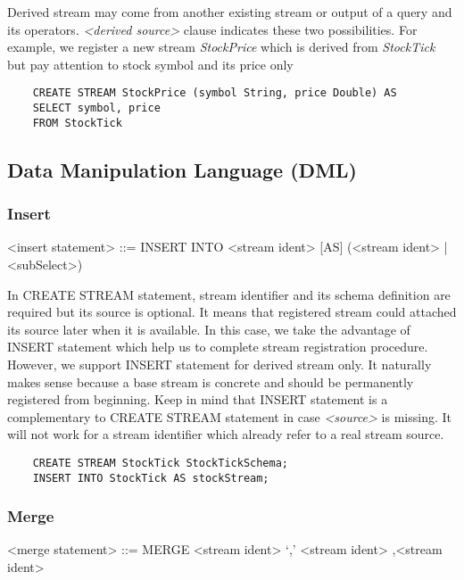 Derived stream may come from another existing stream or output of a query and its operators. \textit{<derived source>} clause indicates these two possibilities. For example, we register a new stream \textit{StockPrice} which is derived from \textit{StockTick} but pay attention to stock symbol and its price only
\begin{lstlisting}
	CREATE STREAM StockPrice (symbol String, price Double) AS
	SELECT symbol, price 
	FROM StockTick
\end{lstlisting}


\subsection{Data Manipulation Language (DML)}

\subsubsection{Insert}

\begin{grammar}
<insert statement> ::= INSERT INTO <stream ident> [AS] 
							(<stream ident> | <subSelect>)
\end{grammar}

In CREATE STREAM statement, stream identifier and its schema definition are required but its source is optional. It means that registered stream could attached its source later when it is available. In this case, we take the advantage of INSERT statement which help us to complete stream registration procedure. However, we support INSERT statement for derived stream only. It naturally makes sense because a base stream is concrete and should be permanently registered from beginning.
Keep in mind that INSERT statement is a complementary to CREATE STREAM statement in case \textit{<source>} is missing. It will not work for a stream identifier which already refer to a real stream source.

\begin{verbatim}
	CREATE STREAM StockTick StockTickSchema;
	INSERT INTO StockTick AS stockStream;
\end{verbatim}


\subsubsection{Merge}
\begin{grammar}
<merge statement> ::= MERGE <stream ident> `,' <stream ident> {,<stream ident>}
\end{grammar}

